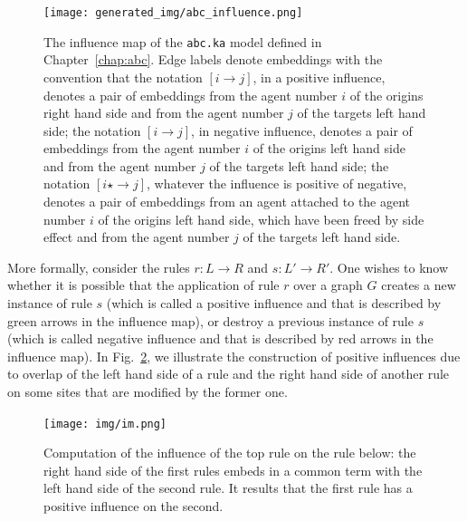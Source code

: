 \documentclass[11pt]{book}
\def\ttt#1{\texttt{#1}}
\def\rar{\rightarrow}
\begin{document}
\begin{figure}[htbp] %
   \centering
   \texttt{[image: generated\_img/abc\_influence.png]} 
   \caption{The influence map of the \ttt{abc.ka} model defined in Chapter~\ref{chap:abc}. Edge labels denote embeddings with the convention that 
the notation $[i\rar j]$, in a positive influence, denotes a pair of embeddings from the agent number $i$ of the origin{\textquotesingle}s right hand side and from the agent number $j$ of the target{\textquotesingle}s left hand side; 
the notation $[i\rar j]$, in negative influence,  denotes a pair of embeddings from the agent number $i$ of the origin{\textquotesingle}s left hand side and from the agent number $j$ of the target{\textquotesingle}s left hand side; 
the notation $[i\star \rar j]$, whatever the influence is positive of negative,  denotes a pair of embeddings from an agent attached to the agent number $i$  of the origin{\textquotesingle}s left hand side, which have been freed by side effect  and   from the agent number $j$ of the target{\textquotesingle}s left hand side. }
   \label{fig:kasa-abc-im}
\end{figure}

More formally, consider the rules $r:L\rar R$ and $s:L'\rar R'$. One wishes to know whether it is possible that the application of rule $r$ over a graph $G$ creates a new instance of rule $s$ (which is called a positive influence and that is described by green arrows in the influence map), or destroy a previous instance of rule $s$ (which is called negative influence and that is described by red arrows in the influence map). 
In Fig.~\ref{fig:imbis}, we illustrate the construction of positive influences due to overlap of the left hand side of a rule and the right hand side of another rule on some sites that are modified by the former one. 

\begin{figure}[htbp] %
   \centering
\texttt{[image: img/im.png]}
   \caption{Computation of the influence of the top rule on the rule below: the right hand side of the first rules embeds in a common term with the left hand side of the second rule. It results that the first rule has a positive influence on the second.}
   \label{fig:imbis}
\end{figure}
\end{document}
